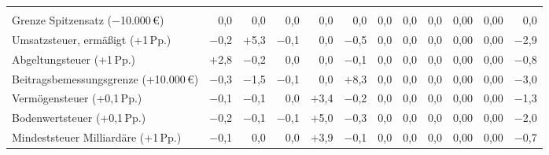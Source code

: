 \begin{tabular}{@{}l*{11}{r}@{}}
\addlinespace
\multicolumn{12}{@{}l}{\emph{Weitere Stellgrößen}} \\
Grenze Spitzensatz ($-$10.000\,\euro{}) & 0,0 & 0,0 & 0,0 & 0,0 & 0,0 & 0,0 & 0,0 & 0,0 & 0,00 & 0,00 & 0,0 \\
Umsatzsteuer, ermäßigt (+1\,Pp.) & $-$0,2 & $+$5,3 & $-$0,1 & 0,0 & $-$0,5 & 0,0 & 0,0 & 0,0 & 0,00 & 0,00 & $-$2,9 \\
Abgeltungsteuer (+1\,Pp.) & $+$2,8 & $-$0,2 & 0,0 & 0,0 & $-$0,1 & 0,0 & 0,0 & 0,0 & 0,00 & 0,00 & $-$0,8 \\
Beitragsbemessungsgrenze (+10.000\,\euro{}) & $-$0,3 & $-$1,5 & $-$0,1 & 0,0 & $+$8,3 & 0,0 & 0,0 & 0,0 & 0,00 & 0,00 & $-$3,0 \\
Vermögensteuer (+0,1\,Pp.) & $-$0,1 & $-$0,1 & 0,0 & $+$3,4 & $-$0,2 & 0,0 & 0,0 & 0,0 & 0,00 & 0,00 & $-$1,3 \\
Bodenwertsteuer (+0,1\,Pp.) & $-$0,2 & $-$0,1 & $-$0,1 & $+$5,0 & $-$0,3 & 0,0 & 0,0 & 0,0 & 0,00 & 0,00 & $-$2,0 \\
Mindeststeuer Milliardäre (+1\,Pp.) & $-$0,1 & 0,0 & 0,0 & $+$3,9 & $-$0,1 & 0,0 & 0,0 & 0,0 & 0,00 & 0,00 & $-$0,7 \\
\bottomrule
\end{tabular}

